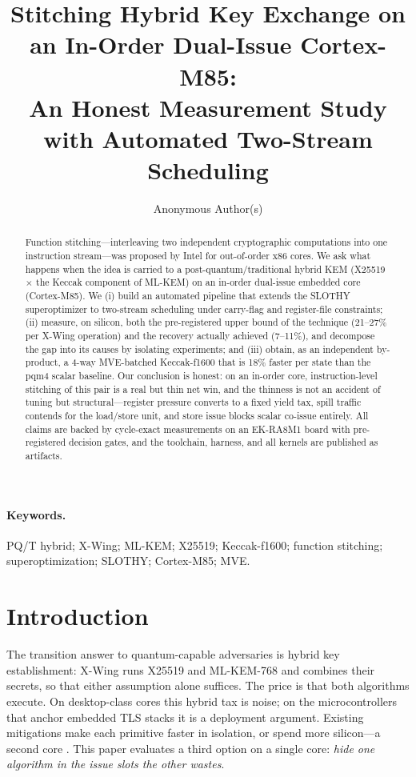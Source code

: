 \documentclass[11pt,a4paper]{article}
\title{Stitching Hybrid Key Exchange on an In-Order Dual-Issue Cortex-M85:\\
An Honest Measurement Study with Automated Two-Stream Scheduling}
\author{Anonymous Author(s)}\date{}
\newcommand{\xwing}{X-Wing}\newcommand{\slothy}{SLOTHY}\newcommand{\keccak}{Keccak-f1600}
\begin{document}
\maketitle

\begin{abstract}
Function stitching---interleaving two independent cryptographic computations into one
instruction stream---was proposed by Intel for out-of-order x86 cores. We ask what
happens when the idea is carried to a post-quantum/traditional hybrid KEM
(X25519 $\times$ the Keccak component of ML-KEM) on an in-order dual-issue embedded
core (Cortex-M85). We (i) build an automated pipeline that extends the \slothy{}
superoptimizer to two-stream scheduling under carry-flag and register-file
constraints; (ii) measure, on silicon, both the pre-registered upper bound of the
technique (21--27\% per \xwing{} operation) and the recovery actually achieved
(7--11\%), and decompose the gap into its causes by isolating experiments; and
(iii) obtain, as an independent by-product, a 4-way MVE-batched \keccak{} that is
18\% faster per state than the pqm4 scalar baseline. Our conclusion is honest:
on an in-order core, instruction-level stitching of this pair is a real but thin
net win, and the thinness is not an accident of tuning but structural---register
pressure converts to a fixed yield tax, spill traffic contends for the load/store
unit, and store issue blocks scalar co-issue entirely. All claims are backed by
cycle-exact measurements on an EK-RA8M1 board with pre-registered decision gates,
and the toolchain, harness, and all kernels are published as artifacts.
\end{abstract}

\paragraph{Keywords.} PQ/T hybrid; \xwing{}; ML-KEM; X25519; \keccak{}; function
stitching; superoptimization; \slothy{}; Cortex-M85; MVE.

\section{Introduction}\label{sec:intro}

The transition answer to quantum-capable adversaries is hybrid key establishment:
\xwing{} \cite{XWing24} runs X25519 and ML-KEM-768 and combines their secrets, so
that either assumption alone suffices. The price is that both algorithms execute.
On desktop-class cores this hybrid tax is noise; on the microcontrollers that
anchor embedded TLS stacks it is a deployment argument. Existing mitigations make
each primitive faster in isolation, or spend more silicon---a second core
\cite{DualCore25,ParHyb26}. This paper evaluates a third option on a single core:
\emph{hide one algorithm in the issue slots the other wastes}.
\end{document}
